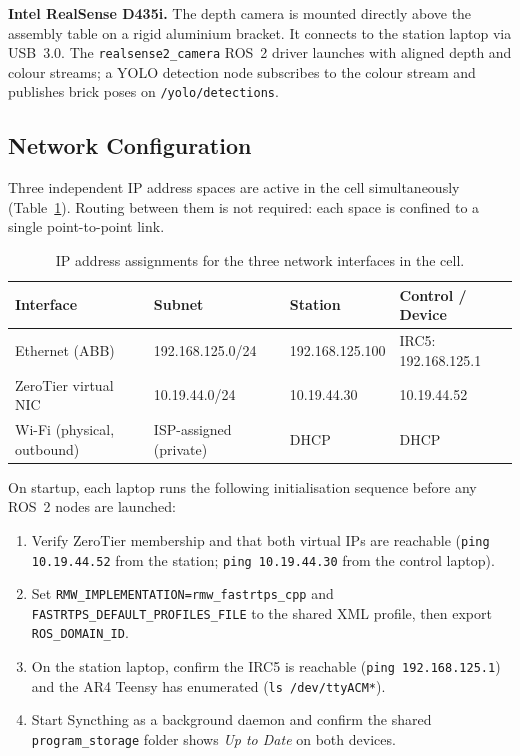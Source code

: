 \textbf{Intel RealSense D435i.} The depth camera is mounted directly above the assembly table on a rigid aluminium bracket.
It connects to the station laptop via USB~3.0.  The \texttt{realsense2\_camera} ROS~2 driver
launches with aligned depth and colour streams; a YOLO detection node subscribes to the colour
stream and publishes brick poses on \texttt{/yolo/detections}.

\subsection{Network Configuration}
\label{subsec:ch6_network_config}

Three independent IP address spaces are active in the cell simultaneously
(Table~\ref{tab:ch6_ip}).  Routing between them is not required: each space is confined to a
single point-to-point link.

\begin{table}[H]
\centering
\caption{IP address assignments for the three network interfaces in the cell.}
\label{tab:ch6_ip}
\setlength{\tabcolsep}{5pt}
\begin{tabular}{llll}
\toprule
\textbf{Interface}          & \textbf{Subnet}       & \textbf{Station}    & \textbf{Control / Device} \\
\midrule
Ethernet (ABB)              & 192.168.125.0/24      & 192.168.125.100     & IRC5: 192.168.125.1 \\
ZeroTier virtual NIC        & 10.19.44.0/24         & 10.19.44.30         & 10.19.44.52 \\
Wi-Fi (physical, outbound)  & ISP-assigned (private)& DHCP                & DHCP \\
\bottomrule
\end{tabular}
\end{table}

On startup, each laptop runs the following initialisation sequence before any ROS~2 nodes are
launched:

\begin{enumerate}
    \item Verify ZeroTier membership and that both virtual IPs are reachable
          (\texttt{ping 10.19.44.52} from the station; \texttt{ping 10.19.44.30} from the
          control laptop).

    \item Set \texttt{RMW\_IMPLEMENTATION=rmw\_fastrtps\_cpp} and
          \texttt{FASTRTPS\_DEFAULT\_PROFILES\_FILE} to the shared XML profile, then export
          \texttt{ROS\_DOMAIN\_ID}.

    \item On the station laptop, confirm the IRC5 is reachable
          (\texttt{ping 192.168.125.1}) and the AR4 Teensy has enumerated
          (\texttt{ls /dev/ttyACM*}).

    \item Start Syncthing as a background daemon and confirm the shared
          \texttt{program\_storage} folder shows \emph{Up to Date} on both devices.
\end{enumerate}


